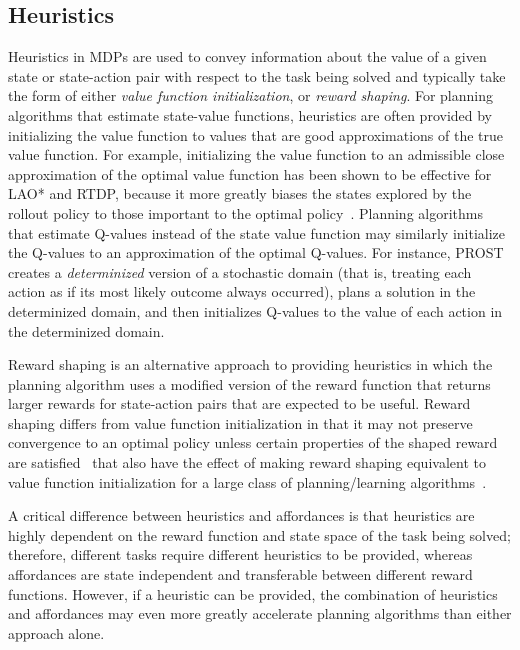 \documentclass[]{article}
\begin{document}
\subsection{Heuristics}
Heuristics in MDPs are used to convey information about the value of a given state or state-action pair with respect to the task being solved and typically take the form of either {\em value function initialization},
or {\em reward shaping}. For planning algorithms that estimate state-value functions, heuristics are often
provided by initializing the value function to values that are good approximations of the true value function. For example, initializing the value function to an admissible close approximation of the optimal value function has been shown to be effective for LAO* and RTDP, because it more greatly biases the states explored by the rollout policy to those important to the optimal policy~\cite{Hansen:1999qf}. Planning algorithms that estimate Q-values instead of the state value function may similarly initialize the Q-values to an approximation of the optimal Q-values. For instance, PROST~\cite{keller2012prost} creates a {\em determinized} version of a stochastic domain (that is, treating each action as if its most likely outcome always occurred), plans a solution in the determinized domain, and then initializes Q-values to the value of each action in the determinized domain.

Reward shaping is an alternative approach to providing heuristics in which the planning algorithm uses a modified version of the reward function that returns larger rewards for state-action pairs that are expected to be useful. Reward shaping differs from value function initialization in that it may not preserve convergence to an optimal policy unless certain properties of the shaped reward are satisfied~\cite{potshap} that also have the effect of making reward shaping equivalent to value function initialization for a large class of planning/learning algorithms~\cite{Wiewiora:2003fk}.

A critical difference between heuristics and affordances is that heuristics are highly dependent on the reward function and state space of the task being solved; therefore, different tasks require different heuristics to be provided, whereas affordances are state independent and transferable between different reward functions. However, if a heuristic can be provided, the combination of heuristics and affordances may even more greatly accelerate planning algorithms than either approach alone.
\end{document}
